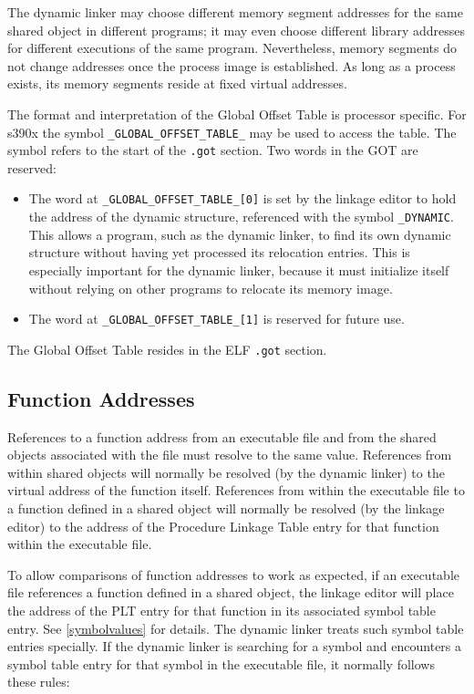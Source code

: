 \documentclass[english,11pt,twoside,toc=bib,toc=idx]{scrreprt}
\newcommand{\ABINAME}{s390x}
\newcommand{\ABINAME}{s390}
\begin{document}
The dynamic linker may choose different memory segment addresses for
the same shared object in different programs; it may even choose
different library addresses for different executions of the same
program.  Nevertheless, memory segments do not change addresses once
the process image is established.  As long as a process exists, its
memory segments reside at fixed virtual addresses.

The format and interpretation of the Global Offset Table is processor
specific.  For \ABINAME{} the symbol \texttt{\_GLOBAL\_OFFSET\_TABLE\_}
may be used to access the table.  The symbol refers to the start of
the \texttt{.got} section.  Two words in the GOT are reserved:
\begin{itemize}
\item The word at \texttt{\_GLOBAL\_OFFSET\_TABLE\_[0]} is set by the
  linkage editor to hold the address of the dynamic structure,
  referenced with the symbol \texttt{\_DYNAMIC}.  This allows a
  program, such as the dynamic linker, to find its own dynamic
  structure without having yet processed its relocation entries.  This
  is especially important for the dynamic linker, because it must
  initialize itself without relying on other programs to relocate its
  memory image.
\item The word at \texttt{\_GLOBAL\_OFFSET\_TABLE\_[1]} is reserved
  for future use.
\end{itemize}

The Global Offset Table resides in the ELF \texttt{.got} section.

\subsection{Function Addresses}
\label{functionaddresses}
References to a function address from an executable file and from the
shared objects associated with the file must resolve to the same
value.  References from within shared objects will normally be resolved
(by the dynamic linker) to the virtual address of the function itself.
References from within the executable file to a function defined in a
shared object will normally be resolved (by the linkage editor) to the
address of the Procedure Linkage Table entry for that function within
the executable file.

To allow comparisons of function addresses to work as expected, if an
executable file references a function defined in a shared object, the
linkage editor will place the address of the PLT entry for that
function in its associated symbol table entry.  See
\cref{symbolvalues} for details.  The dynamic linker treats
such symbol table entries specially.  If the dynamic linker is
searching for a symbol and encounters a symbol table entry for that
symbol in the executable file, it normally follows these rules:
\end{document}
